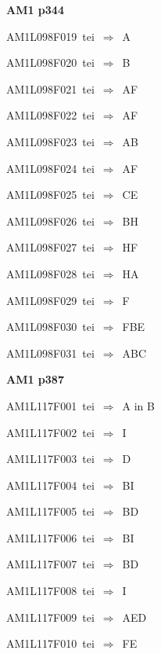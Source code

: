 \par\vfill\eject
{\bf\hfill AM1 p344\hfill\hbox{}}\par\bigskip
{\sixrm AM1L098F019\ {\sixit tei}\ }$\Rightarrow$\ A\par\smallskip
{\sixrm AM1L098F020\ {\sixit tei}\ }$\Rightarrow$\ B\par\smallskip
{\sixrm AM1L098F021\ {\sixit tei}\ }$\Rightarrow$\ AF\par\smallskip
{\sixrm AM1L098F022\ {\sixit tei}\ }$\Rightarrow$\ AF\par\smallskip
{\sixrm AM1L098F023\ {\sixit tei}\ }$\Rightarrow$\ AB\par\smallskip
{\sixrm AM1L098F024\ {\sixit tei}\ }$\Rightarrow$\ AF\par\smallskip
{\sixrm AM1L098F025\ {\sixit tei}\ }$\Rightarrow$\ CE\par\smallskip
{\sixrm AM1L098F026\ {\sixit tei}\ }$\Rightarrow$\ BH\par\smallskip
{\sixrm AM1L098F027\ {\sixit tei}\ }$\Rightarrow$\ HF\par\smallskip
{\sixrm AM1L098F028\ {\sixit tei}\ }$\Rightarrow$\ HA\par\smallskip
{\sixrm AM1L098F029\ {\sixit tei}\ }$\Rightarrow$\ F\par\smallskip
{\sixrm AM1L098F030\ {\sixit tei}\ }$\Rightarrow$\ FBE\par\smallskip
{\sixrm AM1L098F031\ {\sixit tei}\ }$\Rightarrow$\ ABC\par\smallskip

\par\vfill\eject
{\bf\hfill AM1 p387\hfill\hbox{}}\par\bigskip
{\sixrm AM1L117F001\ {\sixit tei}\ }$\Rightarrow$\ A {\tenit in} B\par\smallskip
{\sixrm AM1L117F002\ {\sixit tei}\ }$\Rightarrow$\ I\par\smallskip
{\sixrm AM1L117F003\ {\sixit tei}\ }$\Rightarrow$\ D\par\smallskip
{\sixrm AM1L117F004\ {\sixit tei}\ }$\Rightarrow$\ BI\par\smallskip
{\sixrm AM1L117F005\ {\sixit tei}\ }$\Rightarrow$\ BD\par\smallskip
{\sixrm AM1L117F006\ {\sixit tei}\ }$\Rightarrow$\ BI\par\smallskip
{\sixrm AM1L117F007\ {\sixit tei}\ }$\Rightarrow$\ BD\par\smallskip
{\sixrm AM1L117F008\ {\sixit tei}\ }$\Rightarrow$\ I\par\smallskip
{\sixrm AM1L117F009\ {\sixit tei}\ }$\Rightarrow$\ AED\par\smallskip
{\sixrm AM1L117F010\ {\sixit tei}\ }$\Rightarrow$\ FE\par\smallskip


